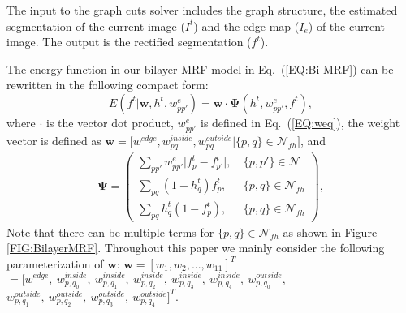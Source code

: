 \documentclass[10pt,journal,compsoc]{newIEEEtran}
\begin{document}
The input to the graph cuts solver includes the graph structure, the estimated segmentation of the current image ($I^t$) and the edge map ($I_e$) of the current image. The output is the rectified segmentation ($f^t$). 

The energy function in our bilayer MRF model in Eq.~(\ref{EQ:Bi-MRF}) can be rewritten in the following compact form:
\begin{equation}\label{EQ:Bi-MRF_linear}
E(f^t|\mathbf{w},h^t,w^e_{pp'}) 
= \mathbf{w}\cdot \mathbf{\Psi}(h^t,w^e_{pp'},f^t),
\end{equation}
where $\cdot$ is the vector dot product, $w^e_{pp'}$ is defined in Eq.~(\ref{EQ:weq}), the weight vector is defined as $
\mathbf{w}=\big[w^{edge}, w^{inside}_{pq}, w^{outside}_{pq}|\{p,q\}\in \mathcal{N}_{fh}\big]
$, and 
\begin{equation}\label{EQ:DefinePsi}
\begin{split}
\mathbf{\Psi} = \left(\begin{array}{lr}
                                              \sum_{pp'}w^{e}_{pp'} \big|f^{t}_p-{f^{t}_{p'}}\big|,&~\{p,p'\}\in\mathcal{N}~~ \\
                                              \sum_{pq}(1-h^t_q)f^{t}_p,&~\{p,q\}\in\mathcal{N}_{fh} \\
                                              \sum_{pq}h^t_q(1-f^{t}_p),&~\{p,q\}\in\mathcal{N}_{fh}
                                            \end{array}\right),
\end{split}
\end{equation}
Note that there can be multiple terms for $\{p,q\}\in \mathcal{N}_{fh}$ as shown in Figure \ref{FIG:BilayerMRF}. Throughout this paper we mainly consider the following parameterization of $\mathbf{w}$: $\mathbf{w} = [w_1,w_2,...,w_{11}]^T$$ = [w^{edge},~ w^{inside}_{p,q_0},~w^{inside}_{p,q_1}, ~w^{inside}_{p,q_2},~w^{inside}_{p,q_3},  ~w^{inside}_{p,q_4}, ~w^{outside}_{p,q_0}, $$ w^{outside}_{p,q_1},~ w^{outside}_{p,q_2},~w^{outside}_{p,q_3},~w^{outside}_{p,q_4}]^T$.
\end{document}
